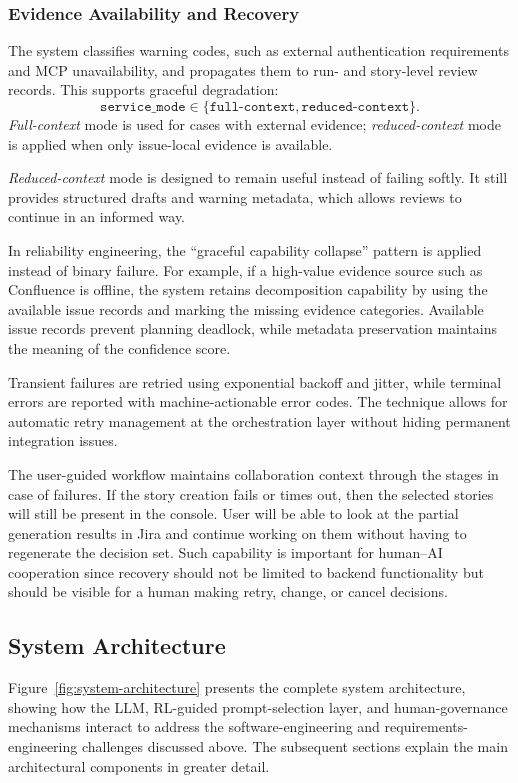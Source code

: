 \documentclass[pdflatex,sn-basic]{sn-jnl}
\begin{document}
\subsubsection{Evidence Availability and Recovery}\label{sec:evidence-recovery}

The system classifies warning codes, such as external authentication requirements and MCP unavailability, and propagates them to run- and story-level review records. This supports graceful degradation:
\begin{equation}
\texttt{service\_mode} \in \{\texttt{full-context},\texttt{reduced-context}\}.
\end{equation}
\textit{Full-context} mode is used for cases with external evidence; \textit{reduced-context} mode is applied when only issue-local evidence is available.

\textit{Reduced-context} mode is designed to remain useful instead of failing softly. It still provides structured drafts and warning metadata, which allows reviews to continue in an informed way.

In reliability engineering, the ``graceful capability collapse'' pattern is applied instead of binary failure. For example, if a high-value evidence source such as Confluence is offline, the system retains decomposition capability by using the available issue records and marking the missing evidence categories. Available issue records prevent planning deadlock, while metadata preservation maintains the meaning of the confidence score.

Transient failures are retried using exponential backoff and jitter, while terminal errors are reported with machine-actionable error codes. The technique allows for automatic retry management at the orchestration layer without hiding permanent integration issues.

The user-guided workflow maintains collaboration context through the stages in case of failures. If the story creation fails or times out, then the selected stories will still be present in the console. User will be able to look at the partial generation results in Jira and continue working on them without having to regenerate the decision set. Such capability is important for human--AI cooperation since recovery should not be limited to backend functionality but should be visible for a human making retry, change, or cancel decisions.

\subsection{System Architecture}
Figure~\ref{fig:system-architecture} presents the complete system architecture, showing how the LLM, RL-guided prompt-selection layer, and human-governance mechanisms interact to address the software-engineering and requirements-engineering challenges discussed above. The subsequent sections explain the main architectural components in greater detail.
\end{document}
